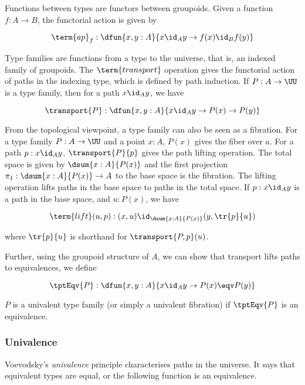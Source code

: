 Functions between types are functors between groupoids. Given a function $f : A \to B$, the functorial action is given
by

\[
  \term{ap}_{f} : \dfun{x,y:A}{x \id_{A} y \to f(x) \id_{B} f(y)}
\]

Type families are functions from a type to the universe, that is, an indexed family of groupoids. The $\term{transport}$
operation gives the functorial action of paths in the indexing type, which is defined by path induction. If
$P : A \to \UU$ is a type family, then for a path $x \id_{A} y$, we have

\[
  \transport{P} : \dfun{x,y:A}{x \id_{A} y \to P(x) \to P(y)}
\]


From the topological viewpoint, a type family can also be seen as a fibration. For a type family $P : A \to \UU$ and a
point $x : A$, $P(x)$ gives the fiber over $a$. For a path $p : x \id_{A} y$, $\transport{P}{p}$ gives the path lifting
operation. The total space is given by $\dsum{x:A}{P(x)}$ and the first projection ${\pi_1 : \dsum{x:A}{P(x)} \to A}$ to
the base space is the fibration. The lifting operation lifts paths in the base space to paths in the total space. If
$p : x \id_{A} y$ is a path in the base space, and $u : P(x)$, we have

\[
  \term{lift}(u,p) : (x , u) \id_{\dsum{x:A}{P(x)}} (y , \tr{p}{u})
\]

where $\tr{p}{u}$ is shorthand for $\transport{P,p}(u)$.

Further, using the groupoid structure of $A$, we can show that transport lifts paths to equivalences, we define

\[
  \tptEqv{P} : \dfun{x,y:A}{x \id_{A} y \to P(x) \eqv P(y)}
\]


\begin{definition}
  $P$ is a univalent type family (or simply a univalent fibration) if $\tptEqv{P}$ is an equivalence.
\end{definition}

\subsubsection{Univalence}

Voevodsky's \emph{univalence} principle characterises paths in the universe. It says that equivalent types are equal, or
the following function is an equivalence.

